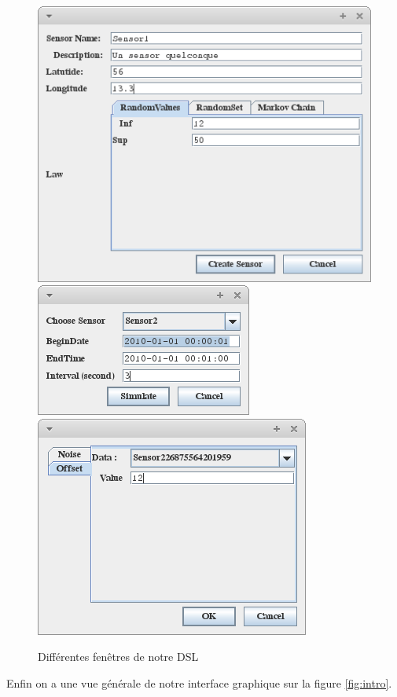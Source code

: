 \documentclass[11pt]{article}
\begin{document}
\begin{figure}
\includegraphics[scale=.4]{Figs/nsensor.png}
\includegraphics[scale=.5]{Figs/simul}
\includegraphics[scale=.5]{Figs/tailoring}
\caption{Différentes fenêtres de notre DSL}
 \label{fig:fen}
\end{figure}

Enfin on a une vue générale de notre interface graphique sur la figure \ref{fig:intro}.
\end{document}
